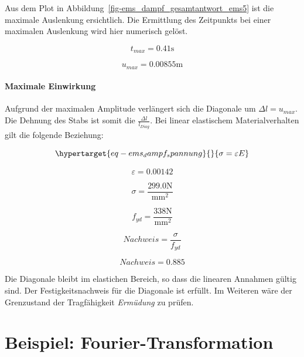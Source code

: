 \documentclass[
  letterpaper,
  DIV=11]{scrreprt}
\begin{document}
Aus dem Plot in Abbildung~\ref{fig-ems_dampf_gesamtantwort_ems5} ist die
maximale Auslenkung ersichtlich. Die Ermittlung des Zeitpunkts bei einer
maximalen Auslenkung wird hier numerisch gelöst.

\begin{equation}t_{max} = 0.41 \text{s}\end{equation}

\begin{equation}u_{max} = 0.00855 \text{m}\end{equation}

\hypertarget{maximale-einwirkung-1}{%
\subsubsection{Maximale Einwirkung}\label{maximale-einwirkung-1}}

Aufgrund der maximalen Amplitude verlängert sich die Diagonale um
\(\Delta l=u_{max}\). Die Dehnung des Stabs ist somit die
\(\frac{\Delta l}{l_{Diag}}\). Bei linear elastischem Materialverhalten
gilt die folgende Beziehung:

\begin{equation}\protect\hypertarget{eq-ems_dampf_spannung}{}{
\sigma = \varepsilon E
}\label{eq-ems_dampf_spannung}\end{equation}

\begin{equation}\varepsilon = 0.00142\end{equation}

\begin{equation}\sigma = \frac{299.0 \text{N}}{\text{mm}^{2}}\end{equation}

\begin{equation}f_{yd} = \frac{338 \text{N}}{\text{mm}^{2}}\end{equation}

\begin{equation}Nachweis = \frac{\sigma}{f_{yd}}\end{equation}

\begin{equation}Nachweis = 0.885\end{equation}

Die Diagonale bleibt im elastichen Bereich, so dass die linearen
Annahmen gültig sind. Der Festigkeitsnachweis für die Diagonale ist
erfüllt. Im Weiteren wäre der Grenzustand der Tragfähigkeit
\emph{Ermüdung} zu prüfen.

\hypertarget{beispiel-fourier-transformation}{%
\chapter{Beispiel:
Fourier-Transformation}\label{beispiel-fourier-transformation}}
\end{document}

